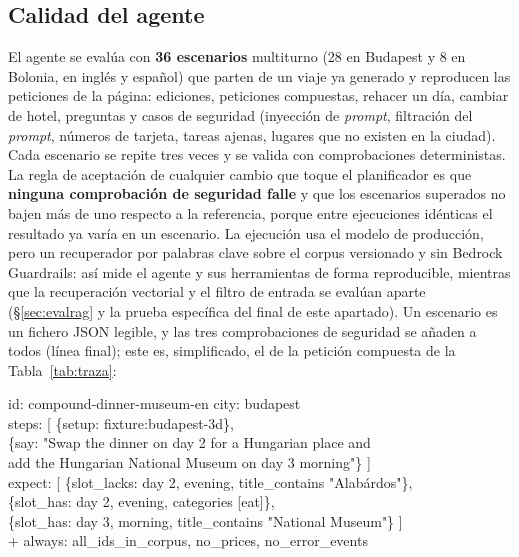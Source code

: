 \subsection{Calidad del agente}\label{sec:evalagente}

El agente se evalúa con \textbf{36 escenarios} multiturno (28 en Budapest y 8 en Bolonia, en
inglés y español) que parten de un viaje ya generado y reproducen las peticiones de la página: ediciones,
peticiones compuestas, rehacer un día, cambiar de hotel, preguntas y casos de seguridad (inyección
de \emph{prompt}, filtración del \emph{prompt}, números de tarjeta, tareas ajenas, lugares que no
existen en la ciudad). Cada escenario se repite tres veces y se valida con comprobaciones
deterministas. La regla de aceptación de cualquier cambio que toque el planificador es que
\textbf{ninguna comprobación de seguridad falle} y que los escenarios superados no bajen más de uno
respecto a la referencia, porque entre ejecuciones idénticas el resultado ya varía en un
escenario. La ejecución usa el
modelo de producción, pero un recuperador por palabras clave sobre el corpus versionado y sin
Bedrock Guardrails: así mide el agente y sus herramientas de forma reproducible, mientras que la
recuperación vectorial y el filtro de entrada se evalúan aparte (§\ref{sec:evalrag} y la prueba
específica del final de este apartado). Un escenario es un fichero JSON legible, y las tres
comprobaciones de seguridad se añaden a todos (línea final); este es, simplificado, el de la
petición compuesta de la Tabla~\ref{tab:traza}:

\noindent\colorbox{klight}{\parbox{\dimexpr\columnwidth-2\fboxsep}{\ttfamily\scriptsize
id: compound-dinner-museum-en \quad city: budapest\\
steps: [ \{setup: fixture:budapest-3d\},\\
\hspace*{1.5em}\{say: "Swap the dinner on day 2 for a Hungarian place and\\
\hspace*{3.5em}add the Hungarian National Museum on day 3 morning"\} ]\\
expect: [ \{slot\_lacks: day 2, evening, title\_contains "Alabárdos"\},\\
\hspace*{3.6em}\{slot\_has: day 2, evening, categories [eat]\},\\
\hspace*{3.6em}\{slot\_has: day 3, morning, title\_contains "National Museum"\} ]\\
+ always: all\_ids\_in\_corpus, no\_prices, no\_error\_events}}

